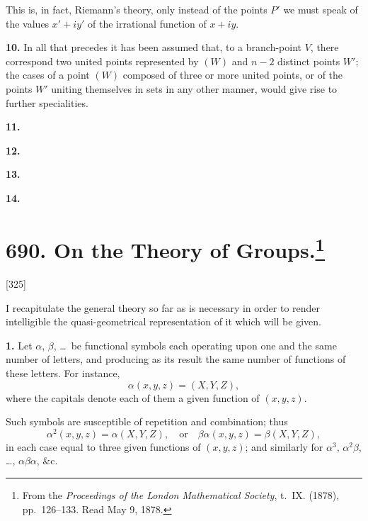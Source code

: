 \documentclass[11pt,a4paper]{book}
\begin{document}
This is, in fact, Riemann's theory, only instead of the points $P'$ we must speak of the values $x' + iy'$ of the irrational function of $x + iy$.

\medskip
\noindent\textbf{10.}\quad
In all that precedes it has been assumed that, to a branch-point $V$, there correspond two united points represented by $(W)$ and $n - 2$ distinct points $W'$; the cases of a point $(W)$ composed of three or more united points, or of the points $W'$ uniting themselves in sets in any other manner, would give rise to further specialities.

\medskip
\noindent\textbf{11.}

\medskip
\noindent\textbf{12.}

\medskip
\noindent\textbf{13.}

\medskip
\noindent\textbf{14.}

\newpage
\section[On the Theory of Groups]{690. On the Theory of Groups.\footnote{From the \textit{Proceedings of the London Mathematical Society}, t.\ IX. (1878), pp.\ 126--133. Read May 9, 1878.}}

[325]

I recapitulate the general theory so far as is necessary in order to render intelligible the quasi-geometrical representation of it which will be given.

\medskip
\noindent\textbf{1.}\quad
Let $\alpha$, $\beta$, \dots\ be functional symbols each operating upon one and the same number of letters, and producing as its result the same number of functions of these letters. For instance,
\[
\alpha(x, y, z) = (X, Y, Z),
\]
where the capitals denote each of them a given function of $(x, y, z)$.

Such symbols are susceptible of repetition and combination; thus
\[
\alpha^2(x, y, z) = \alpha(X, Y, Z),\quad \text{or}\quad
\beta\alpha(x, y, z) = \beta(X, Y, Z),
\]
in each case equal to three given functions of $(x, y, z)$; and similarly for $\alpha^3$, $\alpha^2\beta$, \dots, $\alpha\beta\alpha$, \&c.
\end{document}
